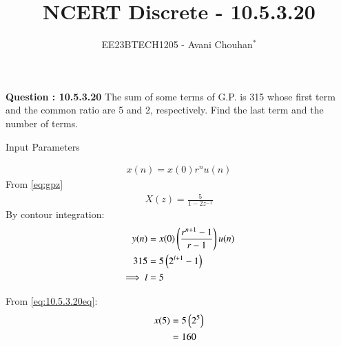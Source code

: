 \documentclass[journal,12pt,twocolumn]{IEEEtran}
\theoremstyle{remark}
\begin{document}

\vspace{3cm}

\title{NCERT Discrete - 10.5.3.20}
\author{EE23BTECH1205 - Avani Chouhan$^{*}$%
}
\maketitle
\newpage
\bigskip

\renewcommand{\thefigure}{\theenumi}
\renewcommand{\thetable}{\theenumi}

\vspace{3cm}
\textbf{Question : 10.5.3.20} 
The sum of some terms of G.P. is 315 whose first term and the common ratio are 5 and 2, respectively. Find the last term and the number of terms.\\
\solution

\begin{table}
  \centering
  
  
  \caption{Input Parameters}
  \label{tab:10.5.3.20table1}
\end{table}
\begin{align}
x(n) = x(0)r^{n}u(n)
\label{eq:10.5.3.20eq}
\end{align}
From \eqref{eq:gpz}
\begin{align}
X(z) =\frac{5}{1-2z^{-1}}
\end{align}
By contour integration:
\begin{align}
y(n) &= x(0)\left(\frac{r^{n+1}-1}{r-1}\right)u(n)\\
315 &= 5\left(2^{l+1}- 1\right)  \\
\implies l &= 5
\end{align}


From \eqref{eq:10.5.3.20eq}:
\begin{align}
x(5) &= 5\left(2^{5}\right)\\
 &= 160 
\end{align}
\end{document}
